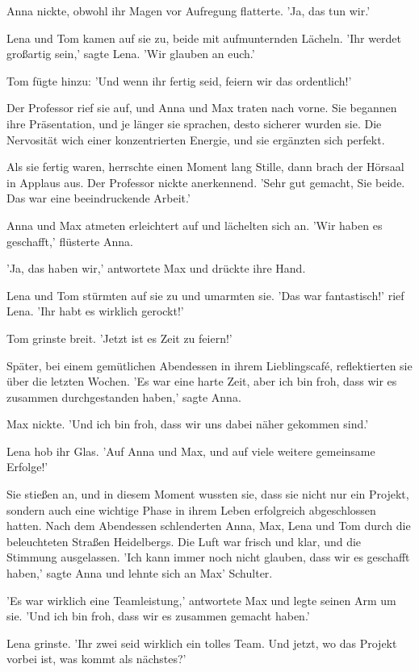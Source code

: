 \documentclass[12pt]{article}
\begin{document}
Anna nickte, obwohl ihr Magen vor Aufregung flatterte. 'Ja, das tun wir.'

Lena und Tom kamen auf sie zu, beide mit aufmunternden Lächeln. 'Ihr werdet großartig sein,' sagte Lena. 'Wir glauben an euch.'

Tom fügte hinzu: 'Und wenn ihr fertig seid, feiern wir das ordentlich!'

Der Professor rief sie auf, und Anna und Max traten nach vorne. Sie begannen ihre Präsentation, und je länger sie sprachen, desto sicherer wurden sie. Die Nervosität wich einer konzentrierten Energie, und sie ergänzten sich perfekt.

Als sie fertig waren, herrschte einen Moment lang Stille, dann brach der Hörsaal in Applaus aus. Der Professor nickte anerkennend. 'Sehr gut gemacht, Sie beide. Das war eine beeindruckende Arbeit.'

Anna und Max atmeten erleichtert auf und lächelten sich an. 'Wir haben es geschafft,' flüsterte Anna.

'Ja, das haben wir,' antwortete Max und drückte ihre Hand.

Lena und Tom stürmten auf sie zu und umarmten sie. 'Das war fantastisch!' rief Lena. 'Ihr habt es wirklich gerockt!'

Tom grinste breit. 'Jetzt ist es Zeit zu feiern!'

Später, bei einem gemütlichen Abendessen in ihrem Lieblingscafé, reflektierten sie über die letzten Wochen. 'Es war eine harte Zeit, aber ich bin froh, dass wir es zusammen durchgestanden haben,' sagte Anna.

Max nickte. 'Und ich bin froh, dass wir uns dabei näher gekommen sind.'

Lena hob ihr Glas. 'Auf Anna und Max, und auf viele weitere gemeinsame Erfolge!'

Sie stießen an, und in diesem Moment wussten sie, dass sie nicht nur ein Projekt, sondern auch eine wichtige Phase in ihrem Leben erfolgreich abgeschlossen hatten. Nach dem Abendessen schlenderten Anna, Max, Lena und Tom durch die beleuchteten Straßen Heidelbergs. Die Luft war frisch und klar, und die Stimmung ausgelassen. 'Ich kann immer noch nicht glauben, dass wir es geschafft haben,' sagte Anna und lehnte sich an Max' Schulter.

'Es war wirklich eine Teamleistung,' antwortete Max und legte seinen Arm um sie. 'Und ich bin froh, dass wir es zusammen gemacht haben.'

Lena grinste. 'Ihr zwei seid wirklich ein tolles Team. Und jetzt, wo das Projekt vorbei ist, was kommt als nächstes?'
\end{document}
